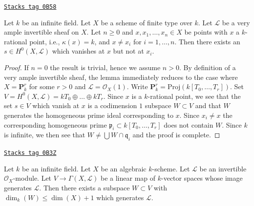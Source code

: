 \begin{lemma}
\label{varieties-lemma-very-ample-vanish-at-point}
\href{https://stacks.math.columbia.edu/tag/0B58}{\texttt{Stacks tag 0B58}}

Let $k$ be an infinite field. Let $X$ be a scheme of finite type over $k$.
Let $\mathcal{L}$ be a very ample invertible sheaf on $X$.
Let $n \geq 0$ and $x, x_1, \ldots, x_n \in X$ be points with
$x$ a $k$-rational point, i.e., $\kappa(x) = k$, and
$x \not = x_i$ for $i = 1, \ldots, n$.
Then there exists an $s \in H^0(X, \mathcal{L})$ which vanishes at
$x$ but not at $x_i$.
\end{lemma}

\begin{proof}
If $n = 0$ the result is trivial, hence we assume $n > 0$.
By definition of a very ample invertible sheaf, the lemma immediately
reduces to the case where $X = \mathbf{P}^r_k$ for some $r > 0$
and $\mathcal{L} = \mathcal{O}_X(1)$. Write
$\mathbf{P}^r_k = \text{Proj}(k[T_0, \ldots, T_r])$.
Set $V = H^0(X, \mathcal{L}) = kT_0 \oplus \ldots \oplus kT_r$.
Since $x$ is a $k$-rational point, we see that the set
$s \in V$ which vanish at $x$ is a codimension $1$ subspace
$W \subset V$ and that $W$ generates the homogeneous prime
ideal corresponding to $x$. Since $x_i \not = x$ the corresponding
homogeneous prime $\mathfrak p_i \subset k[T_0, \ldots, T_r]$ does
not contain $W$. Since $k$ is infinite, we then see that
$W \not = \bigcup W \cap \mathfrak q_i$ and the proof is complete.
\end{proof}

\begin{lemma}
\label{varieties-lemma-generated-by-dim-plus-1-sections}
\href{https://stacks.math.columbia.edu/tag/0B3Z}{\texttt{Stacks tag 0B3Z}}

Let $k$ be an infinite field. Let $X$ be an algebraic $k$-scheme.
Let $\mathcal{L}$ be an invertible $\mathcal{O}_X$-module.
Let $V \to \Gamma(X, \mathcal{L})$ be a linear map of $k$-vector spaces
whose image generates $\mathcal{L}$. Then there exists a subspace
$W \subset V$ with $\dim_k(W) \leq \dim(X) + 1$ which generates $\mathcal{L}$.
\end{lemma}

